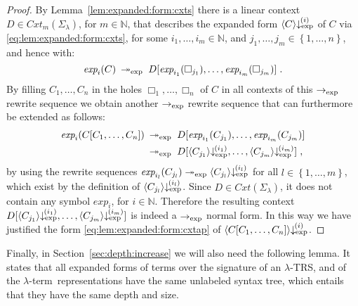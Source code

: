 \documentclass[
submission
]{dmtcs-episciences-tampered}
\newcommand{\fap}[2]{#1({#2})}
\newcommand{\iap}[2]{#1 _{#2}}
\newcommand{\indap}[2]{#1 _{#2}}
\newcommand{\subap}[2]{#1 _{#2}}
\newcommand{\bap}{\subap}
\newcommand{\bpap}[3]{#1 _{#2}^{#3}}
\newcommand{\nb}{\nobreakdash}
\newcommand{\nf}{\normalfont}
\newcommand{\punc}[1]{\ensuremath{\hspace*{3pt}{#1}}}
\newcommand{\setexp}[1]{\left\{{#1}\right\}}
\newcommand{\nat}{\mathbb{N}}
\newcommand{\asig}{\Sigma}
\newcommand{\asiglambda}{\indap{\asig}{\lambda}}
\newcommand{\TRS}{TRS}
\newcommand{\scontextsover}{\textit{Cxt}}
\newcommand{\contextsover}{\fap{\scontextsover}}
\newcommand{\scontextsnover}{\bap{\scontextsover}}
\newcommand{\contextsnover}[1]{\fap{\scontextsnover{#1}}}
\newcommand{\cxtap}[2]{{#1}[#2]}
\newcommand{\acxt}{C}
\newcommand{\bcxt}{D}
\newcommand{\acxtap}{\cxtap{\acxt}}
\newcommand{\bcxtap}{\cxtap{\bcxt}}
\newcommand{\acxti}{\bap{\acxt}}
\newcommand{\hole}{\Box}
\newcommand{\holei}{\iap{\hole}}
\newcommand{\sred}{\to}
\newcommand{\sredi}{\indap{\sred}}
\newcommand{\smred}{\twoheadrightarrow}
\newcommand{\smredi}{\indap{\smred}}
\newcommand{\mredi}[1]{\mathrel{\smredi{#1}}}
\newcommand{\scriptexp}{\text{\nf exp}}
\newcommand{\sexpand}{\textit{exp}}
\newcommand{\sexpandi}{\indap{\sexpand}}
\newcommand{\expandi}[1]{\fap{\sexpandi{#1}}}
\newcommand{\sexpred}{\sredi{\scriptexp}}
\newcommand{\expmred}{\mredi{\scriptexp}}
\newcommand{\sexprednfi}[1]{{\bpap{\downarrow}{\scriptexp}{\hspace*{-1pt}(#1)}}}
\newcommand{\exprednfi}[2]{{\langle#2\rangle}\sexprednfi{#1}}
\newcommand{\lambdaterm}{$\lambda$\nb-term}
\newcommand{\lTRS}{$\lambda$\hspace*{-0.5pt}\nb-\hspace*{-0.5pt}\TRS}
\theoremstyle{plain}
\theoremstyle{definition}
\begin{document}
\begin{proof}
  By Lemma~\ref{lem:expanded:form:cxts} there is 
  a linear context $\bcxt\in\contextsnover{m}{\asiglambda}$, for $m\in\nat$,
  that describes the expanded form $\exprednfi{i}{\acxt}$ of $\acxt$ via \eqref{eq:lem:expanded:form:cxts},
  for some $i_1,\ldots,i_m\in\nat$, and $j_1,\ldots,j_m\in\setexp{1,\ldots,n}$,
  and hence with:
  \begin{equation*}\expandi{i}{\acxt}
      \:\expmred\;
    \bcxtap{\expandi{i_1}{\holei{j_1}},\ldots,\expandi{i_m}{\holei{j_m}}} \punc{.}
  \end{equation*} 
  By filling $\acxti{1},\ldots,\acxti{n}$ in the holes $\holei{1},\ldots,\holei{n}$ of $\acxt$
  in all contexts of this $\sexpred$ rewrite sequence
  we obtain another $\sexpred$ rewrite sequence
  that can furthermore be extended as follows:
  \begin{align*}
    \expandi{i}{\acxtap{\acxti{1},\ldots,\acxti{n}}}
      \: & \expmred\;
    \bcxtap{\expandi{i_1}{\acxti{j_1}},\ldots,\expandi{i_m}{\acxti{j_m}}}
    \\
      \: & \expmred\;
    \bcxtap{\exprednfi{i_1}{\acxti{j_1}},\ldots,\exprednfi{i_m}{\acxti{j_m}}} \punc{,}
  \end{align*}  
  by using the rewrite sequences $\expandi{i_l}{\acxti{j_l}} \expmred \exprednfi{i_l}{\acxti{j_l}}$
  for all $l\in\setexp{1,\ldots,m}$, which exist by the definition of $\exprednfi{i_l}{\acxti{j_l}}$.
  Since $\bcxt\in\contextsover{\asiglambda}$, it does not contain any symbol $\sexpandi{i}$, for $i\in\nat$.
  Therefore the resulting context $\bcxtap{\exprednfi{i_1}{\acxti{j_1}},\ldots,\exprednfi{i_m}{\acxti{j_m}}}$
  is indeed a $\sexpred$ normal form.
  In this way we have justified the form \eqref{eq:lem:expanded:form:cxtap} of $\exprednfi{i}{ \acxtap{ \acxti{1},\ldots,\acxti{n} } }$.
\end{proof}


Finally, in Section~\ref{sec:depth:increase} we will also need the following lemma.
It states that all expanded forms of terms over the signature of an \lTRS, and of the \lambdaterm\ representations
have the same unlabeled syntax tree, which entails that they have the same depth and size.
\end{document}
